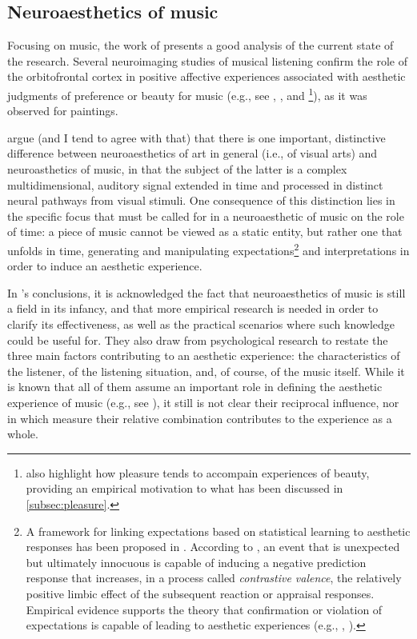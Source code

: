 \subsection{Neuroaesthetics of music}\label{subsec:music-neuroaesthetics}
Focusing on music, the work of \cite{brattico2013neuroaesthetics} presents a good analysis of the current state of the research. Several neuroimaging studies of musical listening confirm the role of the orbitofrontal cortex in positive affective experiences associated with aesthetic judgments of preference or beauty for music (e.g., see \cite{alluri2012large}, \cite{brattico2011functional}, and \cite{blood2001intensely}\footnote{\citeauthor{blood2001intensely} also highlight how pleasure tends to accompain experiences of beauty, providing an empirical motivation to what has been discussed in \autoref{subsec:pleasure}.}), as it was observed for paintings.

\citeauthor{brattico2013neuroaesthetics} argue (and I tend to agree with that) that there is one important, distinctive difference between neuroaesthetics of art in general (i.e., of visual arts) and neuroasthetics of music, in that the subject of the latter is a complex multidimensional, auditory signal extended in time and processed in distinct neural pathways from visual stimuli. One consequence of this distinction lies in the specific focus that must be called for in a neuroaesthetic of music on the role of time: a piece of music cannot be viewed as a static entity, but rather one that unfolds in time, generating and manipulating expectations\footnote{A framework for linking expectations based on statistical learning to aesthetic responses has been proposed in \cite{huron2006sweet}. According to \citeauthor{huron2006sweet}, an event that is unexpected but ultimately innocuous is capable of inducing a negative prediction response that increases, in a process called \emph{contrastive valence}, the relatively positive limbic effect of the subsequent reaction or appraisal responses. Empirical evidence supports the theory that confirmation or violation of expectations is capable of leading to
aesthetic experiences (e.g., \cite{vitz1966affect}, \cite{crozier1974verbal}).} and interpretations in order to induce an aesthetic experience.

In \citeauthor{brattico2013neuroaesthetics}'s conclusions, it is acknowledged the fact that neuroaesthetics of music is still a field in its infancy, and that more empirical research is needed in order to clarify its effectiveness, as well as the practical scenarios where such knowledge could be useful for. They also draw from psychological research to restate the three main factors contributing to an aesthetic experience: the characteristics of the listener, of the listening situation, and, of course, of the music itself. While it is known that all of them assume an important role in defining the aesthetic experience of music (e.g., see \cite{hargreaves201021}), it still is not clear their reciprocal influence, nor in which measure their relative combination contributes to the experience as a whole.

